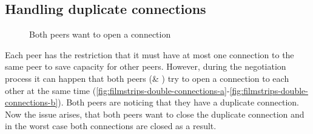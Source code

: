 \subsection{Handling duplicate connections}

\begin{figure}[htb!]
  \centering
	\caption{Both peers want to open a connection}
\label{fig:filmstrips-double-connections}
\end{figure}

Each peer has the restriction that it must have at most one connection to the same peer to save capacity for other peers. However, during the negotiation process it can happen that both peers (\bob \& \claire) try to open a connection to each other at the same time (\vref{fig:filmstrips-double-connections-a}-\vref{fig:filmstrips-double-connections-b}). Both peers are noticing that they have a duplicate connection. Now the issue arises, that both peers want to close the duplicate connection and in the worst case both connections are closed as a result.

